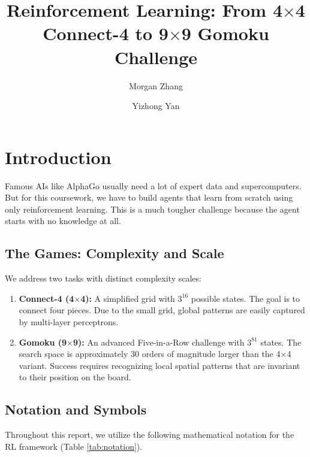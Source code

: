 \documentclass[9pt,a4paper,twocolumn,twoside]{rho-class/rho}
\title{Reinforcement Learning: From 4$\times$4 Connect-4 to 9$\times$9 Gomoku Challenge}
\author[a,1]{Morgan Zhang}
\author[b,2]{Yizhong Yan}
\affil[a]{zcabhbi@ucl.ac.uk}
\affil[b]{@ucl.ac.uk}
\begin{document}
    \maketitle
    \thispagestyle{firststyle}

\section{Introduction}
    Famous AIs like AlphaGo usually need a lot of expert data and supercomputers. But for this coursework, we have to build agents that learn from scratch using only reinforcement learning. This is a much tougher challenge because the agent starts with no knowledge at all.

    \subsection{The Games: Complexity and Scale}
        We address two tasks with distinct complexity scales:
        \begin{enumerate}
            \item \textbf{Connect-4 (4$\times$4):} A simplified grid with $3^{16}$ possible states. The goal is to connect four pieces. Due to the small grid, global patterns are easily captured by multi-layer perceptrons.
            \item \textbf{Gomoku (9$\times$9):} An advanced Five-in-a-Row challenge with $3^{81}$ states. The search space is approximately 30 orders of magnitude larger than the 4$\times$4 variant. Success requires recognizing local spatial patterns that are invariant to their position on the board.
        \end{enumerate}

    \subsection{Notation and Symbols}
        Throughout this report, we utilize the following mathematical notation for the RL framework (Table \ref{tab:notation}).
\end{document}
